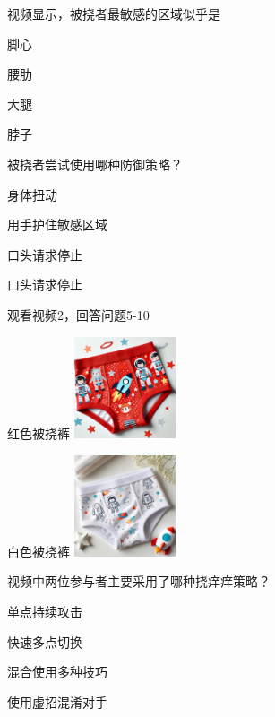 \documentclass{exam-zh}
\begin{document}
\begin{question}[points = 2]
  视频显示，被挠者最敏感的区域似乎是



  \begin{choices}
    \item 脚心
    \item 腰肋
    \item 大腿
    \item 脖子
  \end{choices}
\end{question}

\begin{question}[points = 2]
  被挠者尝试使用哪种防御策略？



  \begin{choices}
    \item 身体扭动
    \item 用手护住敏感区域
    \item 口头请求停止
    \item 口头请求停止
  \end{choices}
\end{question}


观看视频2，回答问题5-10

\begin{multifigures}
\item[ 红色被挠裤 ] \includegraphics [width =3cm]{ red.png}
\item[ 白色被挠裤 ] \includegraphics [width =3cm]{ white.png}
\end{multifigures}

\begin{question}[points = 2]
  视频中两位参与者主要采用了哪种挠痒痒策略？



  \begin{choices}
    \item 单点持续攻击
    \item 快速多点切换
    \item 混合使用多种技巧
    \item 使用虚招混淆对手
  \end{choices}
\end{question}
\end{document}
